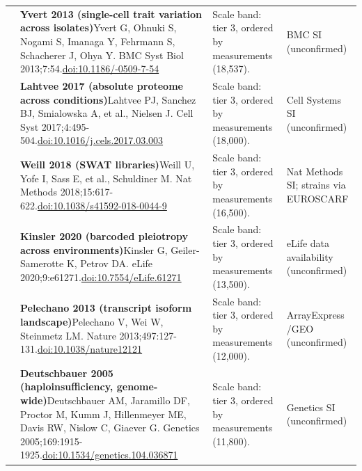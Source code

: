 \begin{landscape}
\begin{longtable}{@{}r@{\hspace{4pt}} L{86mm} L{92mm} L{62mm}@{}}
 & \textbf{Yvert 2013 (single-cell trait variation across isolates)}\newline Yvert G, Ohnuki S, Nogami S, Imanaga Y, Fehrmann S, Schacherer J, Ohya Y. BMC Syst Biol 2013;7:54.\newline \href{https://doi.org/10.1186/1752-0509-7-54}{doi:10.1186/-0509-7-54} & Scale band: tier 3, ordered by measurements (18,537). & BMC SI (unconfirmed) \\
 & \textbf{Lahtvee 2017 (absolute proteome across conditions)}\newline Lahtvee PJ, Sanchez BJ, Smialowska A, et al., Nielsen J. Cell Syst 2017;4:495-504.\newline \href{https://doi.org/10.1016/j.cels.2017.03.003}{doi:10.1016/\allowbreak j.cels.2017.03.003} & Scale band: tier 3, ordered by measurements (18,000). & Cell Systems SI (unconfirmed) \\
 & \textbf{Weill 2018 (SWAT libraries)}\newline Weill U, Yofe I, Sass E, et al., Schuldiner M. Nat Methods 2018;15:617-622.\newline \href{https://doi.org/10.1038/s41592-018-0044-9}{doi:10.1038/\allowbreak s41592-018-0044-9} & Scale band: tier 3, ordered by measurements (16,500). & Nat Methods SI; strains via EUROSCARF \\
 & \textbf{Kinsler 2020 (barcoded pleiotropy across environments)}\newline Kinsler G, Geiler-Samerotte K, Petrov DA. eLife 2020;9:e61271.\newline \href{https://doi.org/10.7554/eLife.61271}{doi:10.7554/\allowbreak eLife.61271} & Scale band: tier 3, ordered by measurements (13,500). & eLife data availability (unconfirmed) \\
 & \textbf{Pelechano 2013 (transcript isoform landscape)}\newline Pelechano V, Wei W, Steinmetz LM. Nature 2013;497:127-131.\newline \href{https://doi.org/10.1038/nature12121}{doi:10.1038/\allowbreak nature12121} & Scale band: tier 3, ordered by measurements (12,000). & ArrayExpress /\allowbreak  GEO (unconfirmed) \\
 & \textbf{Deutschbauer 2005 (haploinsufficiency, genome-wide)}\newline Deutschbauer AM, Jaramillo DF, Proctor M, Kumm J, Hillenmeyer ME, Davis RW, Nislow C, Giaever G. Genetics 2005;169:1915-1925.\newline \href{https://doi.org/10.1534/genetics.104.036871}{doi:10.1534/\allowbreak genetics.104.036871} & Scale band: tier 3, ordered by measurements (11,800). & Genetics SI (unconfirmed) \\

\end{longtable}
\end{landscape}
